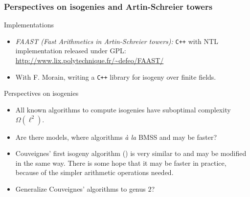 \documentclass[10pt,usepdftitle=false]{beamer}
\begin{document}
\begin{frame}
  \frametitle{Perspectives on isogenies and Artin-Schreier towers}
  
  \begin{block}{Implementations}
    \begin{itemize}
    \item \emph{FAAST (Fast Arithmetics in Artin-Schreier towers):}
      \texttt{C++} with NTL implementation released under GPL:
      \url{http://www.lix.polytechnique.fr/~defeo/FAAST/}
    \item With F. Morain, writing a \texttt{C++} library for isogeny
      over finite fields.
    \end{itemize}
  \end{block}

  \begin{block}{Perspectives on isogenies}
    \begin{itemize}
    \item All known algorithms to compute isogenies have suboptimal
      complexity $\Omega(\ell^2)$.
    \item Are there models, where algorithms \textit{à la} BMSS and
      \cite{lercier+sirvent08} may be faster?
    \item Couveignes' first isogeny algorithm (\cite{couveignes94}) is
      very similar to \cite{couveignes96} and may be modified in the
      same way. There is some hope that it may be faster in practice,
      because of the simpler arithmetic operations needed.
    \item Generalize Couveignes' algorithms to genus $2$?
    \end{itemize}
  \end{block}
\end{frame}
\end{document}
